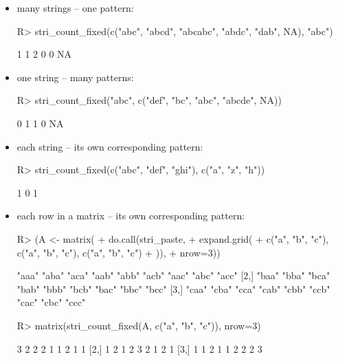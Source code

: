 \documentclass[nojss]{jss}
\begin{document}
\begin{itemize}
\item many strings -- one pattern:

\begin{Schunk}
\begin{Sinput}
R> stri_count_fixed(c("abc", "abcd", "abcabc", "abdc", "dab", NA), "abc")
\end{Sinput}
\begin{Soutput}
[1]  1  1  2  0  0 NA
\end{Soutput}
\end{Schunk}

\item one string -- many patterns:

\begin{Schunk}
\begin{Sinput}
R> stri_count_fixed("abc", c("def", "bc", "abc", "abcde", NA))
\end{Sinput}
\begin{Soutput}
[1]  0  1  1  0 NA
\end{Soutput}
\end{Schunk}

\item each string -- its own corresponding pattern:

\begin{Schunk}
\begin{Sinput}
R> stri_count_fixed(c("abc", "def", "ghi"), c("a", "z", "h"))
\end{Sinput}
\begin{Soutput}
[1] 1 0 1
\end{Soutput}
\end{Schunk}

\item each row in a matrix -- its own corresponding pattern:

\begin{Schunk}
\begin{Sinput}
R> (A <- matrix(
+      do.call(stri_paste,
+          expand.grid(
+              c("a", "b", "c"), c("a", "b", "c"), c("a", "b", "c")
+          )),
+      nrow=3))
\end{Sinput}
\begin{Soutput}
     [,1]  [,2]  [,3]  [,4]  [,5]  [,6]  [,7]  [,8]  [,9]
[1,] "aaa" "aba" "aca" "aab" "abb" "acb" "aac" "abc" "acc"
[2,] "baa" "bba" "bca" "bab" "bbb" "bcb" "bac" "bbc" "bcc"
[3,] "caa" "cba" "cca" "cab" "cbb" "ccb" "cac" "cbc" "ccc"
\end{Soutput}
\begin{Sinput}
R> matrix(stri_count_fixed(A, c("a", "b", "c")), nrow=3)
\end{Sinput}
\begin{Soutput}
     [,1] [,2] [,3] [,4] [,5] [,6] [,7] [,8] [,9]
[1,]    3    2    2    2    1    1    2    1    1
[2,]    1    2    1    2    3    2    1    2    1
[3,]    1    1    2    1    1    2    2    2    3
\end{Soutput}
\end{Schunk}


\end{itemize}
\end{document}
